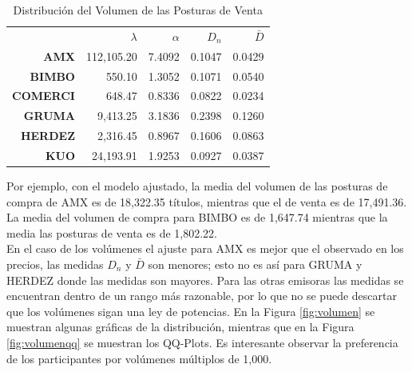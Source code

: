\documentclass[11pt]{article}
\numberwithin{equation}{section} %
\begin{document}
\begin{table}[htbp]
\centering
\caption{Distribución del Volumen de las Posturas de Venta}
\renewcommand{\arraystretch}{1.2}
\begin{tabular}{r|r|r|r|r|}
\cline{2-5}
& $\lambda$ & $\alpha$ & $D_n$ & $\bar{D}$ \\
\cline{2-5}
\textbf{AMX} & 112,105.20 & 7.4092 & 0.1047 & 0.0429 \\
\textbf{BIMBO} & 550.10 & 1.3052 & 0.1071 & 0.0540 \\
\textbf{COMERCI} & 648.47 & 0.8336 & 0.0822 & 0.0234 \\
\textbf{GRUMA} & 9,413.25 & 3.1836 & 0.2398 & 0.1260 \\
\textbf{HERDEZ} & 2,316.45 & 0.8967 & 0.1606 & 0.0863 \\
\textbf{KUO} & 24,193.91 & 1.9253 & 0.0927 & 0.0387 \\
\cline{2-5}
\end{tabular}%
\label{tab:powervolumenventa}%
\end{table}%

Por ejemplo, con el modelo ajustado, la media del volumen de las posturas de compra de AMX es de 18,322.35 títulos, mientras que el de venta es de 17,491.36. La media del volumen de compra para BIMBO es de 1,647.74 mientras que la media las posturas de venta es de 1,802.22.\\

En el caso de los volúmenes el ajuste para AMX es mejor que el observado en los precios, las medidas $D_n$ y $\bar{D}$ son menores; esto no es así para GRUMA y HERDEZ donde las medidas son mayores. Para las otras emisoras las medidas se encuentran dentro de un rango más razonable, por lo que no se puede descartar que los volúmenes sigan una ley de potencias. En la Figura \ref{fig:volumen} se muestran algunas gráficas de la distribución, mientras que en la Figura \ref{fig:volumenqq} se muestran los QQ-Plots. Es interesante observar la preferencia de los participantes por volúmenes múltiplos de 1,000.
\end{document}

